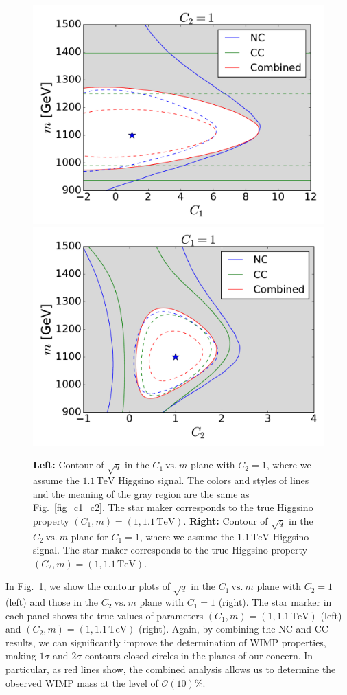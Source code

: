 \documentclass[12pt,twoside,book]{article}
\begin{document}
\begin{figure}[t]
 \centering
 \includegraphics[width=0.48\linewidth]{C1_vs_mass_Higgsino.pdf}
 \includegraphics[width=0.48\linewidth]{C2_vs_mass_Higgsino.pdf}
 \caption{\textbf{Left:} Contour of $\sqrt{q}$ in the
 $C_1~\mathrm{vs.}~m$ plane with $C_2 = 1$,
 where we assume the $1.1\,\mathrm{TeV}$ Higgsino signal.
 The colors and
 styles of lines and the meaning of the gray region are the same as
 Fig.~\ref{fig_c1_c2}.  The star maker corresponds to the true Higgsino
 property $(C_1, m) = (1, 1.1\,\mathrm{TeV})$. \textbf{Right:} Contour
 of $\sqrt{q}$ in the $C_2~\mathrm{vs.}~m$ plane for $C_1 = 1$,
 where we assume the $1.1\,\mathrm{TeV}$ Higgsino signal.
The star maker corresponds to the true Higgsino property $(C_2, m) = (1,
1.1\,\mathrm{TeV})$.
 }
 \label{fig_c1_m}
\end{figure}

In Fig.~\ref{fig_c1_m}, we show the contour
plots of $\sqrt{q}$ in the $C_1~\mathrm{vs.}~m$ plane with $C_2=1$ (left)
and those in the $C_2~\mathrm{vs.}~m$ plane with $C_1=1$ (right).
The star marker in each panel shows the true values of
parameters $(C_1, m) = (1, 1.1\,\mathrm{TeV})$ (left) and $(C_2, m) =
(1, 1.1\,\mathrm{TeV})$ (right).  Again, by combining the NC and CC
results, we can significantly improve the determination of WIMP
properties, making $1\sigma$ and $2\sigma$ contours closed circles in
the planes of our concern.  In particular, as red lines show, the
combined analysis allows us to determine the observed WIMP mass at the
level of $\mathcal{O}(10)\%$.
\end{document}
